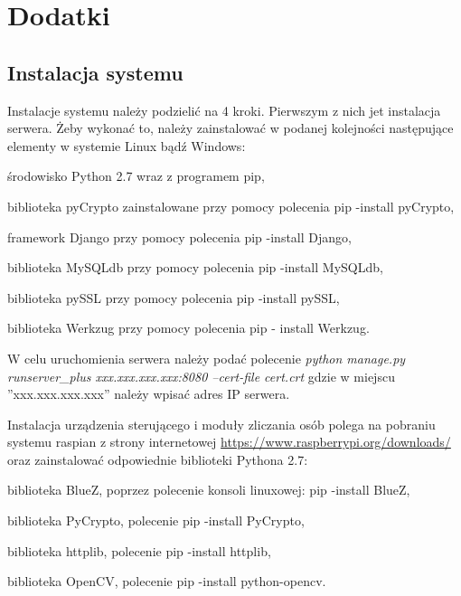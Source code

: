 \newpage
\section*{Dodatki} \label{Dodatki}
\subsection*{Instalacja systemu \NazwaSys}
Instalacje systemu należy podzielić na 4 kroki. Pierwszym z nich jet instalacja serwera. Żeby wykonać to, należy zainstalować w podanej kolejności następujące elementy w systemie Linux bądź Windows:
\begin{itemize*}
	\item środowisko Python 2.7 wraz z programem pip,
	\item biblioteka pyCrypto zainstalowane przy pomocy polecenia pip -install pyCrypto,
	\item  framework Django przy pomocy polecenia pip -install Django,
	\item biblioteka MySQLdb przy pomocy polecenia pip -install MySQLdb,
	\item  biblioteka pySSL przy pomocy polecenia pip -install pySSL,
	\item biblioteka Werkzug przy pomocy polecenia pip - install Werkzug.
\end{itemize*}



W celu uruchomienia serwera należy podać polecenie \textit{python manage.py runserver\_plus xxx.xxx.xxx.xxx:8080 --cert-file cert.crt} gdzie w miejscu ''xxx.xxx.xxx.xxx'' należy wpisać adres IP serwera.

Instalacja urządzenia sterującego i moduły zliczania osób polega na pobraniu systemu raspian z strony internetowej \href{https://www.raspberrypi.org/downloads/}{https://www.raspberrypi.org/downloads/} oraz zainstalować odpowiednie biblioteki Pythona 2.7:
\begin{itemize*}
	\item biblioteka BlueZ, poprzez polecenie konsoli linuxowej: pip -install BlueZ,
	\item biblioteka PyCrypto, polecenie pip -install PyCrypto,
	\item biblioteka httplib, polecenie pip -install httplib,
	\item biblioteka OpenCV, polecenie pip -install python-opencv.
\end{itemize*}

